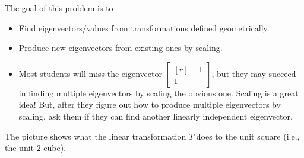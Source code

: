 \documentclass{problemset}
\newcommand{\mat}[1]{\begin{bmatrix*}[r]#1\end{bmatrix*}}
\begin{document}
	\question
	\begin{annotation}
		\begin{goals}

			The goal of this problem is to
			\begin{itemize}
				\item Find eigenvectors/values from transformations defined geometrically.
				\item Produce new eigenvectors from existing ones by scaling.
			\end{itemize}
		\end{goals}

		\begin{notes}
			\begin{itemize}
				\item Most students will miss the eigenvector $\mat{-1\\1}$, but they
					may succeed in finding multiple eigenvectors by scaling the obvious one.
					Scaling is a great idea! But, after they figure out how to produce multiple
					eigenvectors by scaling, ask them if they can find another linearly independent
					eigenvector.
			\end{itemize}
		\end{notes}
	\end{annotation}
	The picture shows what the linear transformation $T$ does to the unit square (i.e., the unit $2$-cube).
\end{document}

